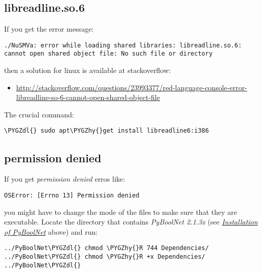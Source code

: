 \documentclass[letterpaper,10pt,english]{sphinxmanual}
\def\PYGZdl{\char`\$}
\def\PYGZhy{\char`\-}
\begin{document}
\subsection{libreadline.so.6}
\label{Installation:libreadline-so-6}
If you get the error message:

\begin{Verbatim}[commandchars=\\\{\}]
./NuSMVa: error while loading shared libraries: libreadline.so.6:
cannot open shared object file: No such file or directory
\end{Verbatim}

then a solution for linux is available at stackoverflow:
\begin{itemize}
\item {} 
\href{http://stackoverflow.com/questions/23993377/red-language-console-error-libreadline-so-6-cannot-open-shared-object-file}{http://stackoverflow.com/questions/23993377/red-language-console-error-libreadline-so-6-cannot-open-shared-object-file}

\end{itemize}

The crucial command:

\begin{Verbatim}[commandchars=\\\{\}]
\PYGZdl{} sudo apt\PYGZhy{}get install libreadline6:i386
\end{Verbatim}


\subsection{permission denied}
\label{Installation:permission-denied}
If you get \emph{permission denied} erros like:

\begin{Verbatim}[commandchars=\\\{\}]
OSError: [Errno 13] Permission denied
\end{Verbatim}

you might have to change the mode of the files to make sure that they are executable.
Locate the directory that contains \emph{PyBoolNet 2.1.3x} (see {\hyperref[Installation:installation-software]{\emph{Installation of PyBoolNet}}} above) and run:

\begin{Verbatim}[commandchars=\\\{\}]
../PyBoolNet\PYGZdl{} chmod \PYGZhy{}R 744 Dependencies/
../PyBoolNet\PYGZdl{} chmod \PYGZhy{}R +x Dependencies/
../PyBoolNet\PYGZdl{}
\end{Verbatim}
\end{document}
